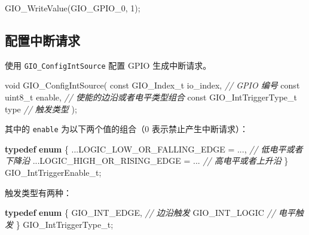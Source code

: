 \documentclass[
  12pt,
]{book}
\newenvironment{Shaded}{\begin{snugshade}}{\end{snugshade}}
\newcommand{\CommentTok}[1]{\textcolor[rgb]{0.56,0.35,0.01}{\textit{#1}}}
\newcommand{\DataTypeTok}[1]{\textcolor[rgb]{0.13,0.29,0.53}{#1}}
\newcommand{\DecValTok}[1]{\textcolor[rgb]{0.00,0.00,0.81}{#1}}
\newcommand{\KeywordTok}[1]{\textcolor[rgb]{0.13,0.29,0.53}{\textbf{#1}}}
\newcommand{\NormalTok}[1]{#1}
\begin{document}
\begin{Shaded}
\begin{Highlighting}[]
\NormalTok{GIO_WriteValue(GIO_GPIO_0, }\DecValTok{1}\NormalTok{);}
\end{Highlighting}
\end{Shaded}

\hypertarget{ux914dux7f6eux4e2dux65adux8bf7ux6c42}{%
\subsection{配置中断请求}\label{ux914dux7f6eux4e2dux65adux8bf7ux6c42}}

使用 \texttt{GIO\_ConfigIntSource} 配置 GPIO 生成中断请求。

\begin{Shaded}
\begin{Highlighting}[]
\DataTypeTok{void}\NormalTok{ GIO_ConfigIntSource(}
  \DataTypeTok{const}\NormalTok{ GIO_Index_t io_index,     }\CommentTok{// GPIO 编号}
  \DataTypeTok{const} \DataTypeTok{uint8_t}\NormalTok{ enable,           }\CommentTok{// 使能的边沿或者电平类型组合}
  \DataTypeTok{const}\NormalTok{ GIO_IntTriggerType_t type }\CommentTok{// 触发类型}
\NormalTok{  );}
\end{Highlighting}
\end{Shaded}

其中的 \texttt{enable} 为以下两个值的组合（0 表示禁止产生中断请求）：

\begin{Shaded}
\begin{Highlighting}[]
\KeywordTok{typedef} \KeywordTok{enum}
\NormalTok{\{}
\NormalTok{    ...LOGIC_LOW_OR_FALLING_EDGE = ..., }\CommentTok{// 低电平或者下降沿}
\NormalTok{    ...LOGIC_HIGH_OR_RISING_EDGE = ...  }\CommentTok{// 高电平或者上升沿}
\NormalTok{\} GIO_IntTriggerEnable_t;}
\end{Highlighting}
\end{Shaded}

触发类型有两种：

\begin{Shaded}
\begin{Highlighting}[]
\KeywordTok{typedef} \KeywordTok{enum}
\NormalTok{\{}
\NormalTok{    GIO_INT_EDGE,   }\CommentTok{// 边沿触发}
\NormalTok{    GIO_INT_LOGIC   }\CommentTok{// 电平触发}
\NormalTok{\} GIO_IntTriggerType_t;}
\end{Highlighting}
\end{Shaded}
\end{document}
